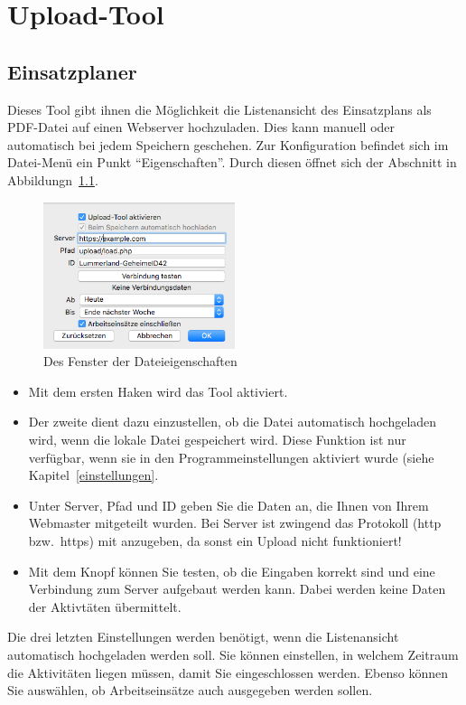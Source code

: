 \chapter{Upload-Tool}\label{upload}
\section{Einsatzplaner}\label{upload:client}
Dieses Tool gibt ihnen die Möglichkeit die Listenansicht des Einsatzplans als PDF-Datei auf einen Webserver hochzuladen.
Dies kann manuell oder automatisch bei jedem Speichern geschehen.
Zur Konfiguration befindet sich im Datei-Menü ein Punkt "`Eigenschaften"'.
Durch diesen öffnet sich der Abschnitt in Abbildungn~\ref{fig:uploadtool}.
\begin{figure}[!h]
  \centering
	\includegraphics[width=0.5\textwidth]{img/eigenschaften_upload}
	\caption{Des Fenster der Dateieigenschaften}
	\label{fig:uploadtool}
\end{figure}
\begin{itemize}
  \item
  Mit dem ersten Haken wird das Tool aktiviert.
  \item
  Der zweite dient dazu einzustellen, ob die Datei automatisch hochgeladen wird, wenn die lokale Datei gespeichert wird.
  Diese Funktion ist nur verfügbar, wenn sie in den Programmeinstellungen aktiviert wurde (siehe Kapitel~\ref{einstellungen}.
  \item
  Unter Server, Pfad und ID geben Sie die Daten an, die Ihnen von Ihrem Webmaster mitgeteilt wurden.
  Bei Server ist zwingend das Protokoll (http bzw.\ https) mit anzugeben, da sonst ein Upload nicht funktioniert!
  \item
  Mit dem Knopf können Sie testen, ob die Eingaben korrekt sind und eine Verbindung zum Server aufgebaut werden kann.
  Dabei werden keine Daten der Aktivtäten übermittelt.
\end{itemize}
Die drei letzten Einstellungen werden benötigt, wenn die Listenansicht automatisch hochgeladen werden soll.
Sie können einstellen, in welchem Zeitraum die Aktivitäten liegen müssen, damit Sie eingeschlossen werden.
Ebenso können Sie auswählen, ob Arbeitseinsätze auch ausgegeben werden sollen.

